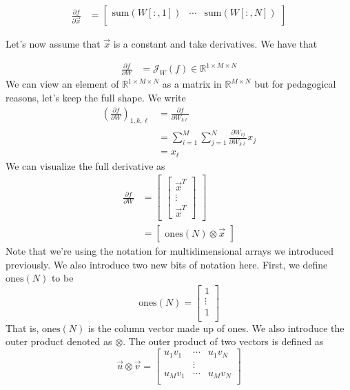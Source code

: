 \documentclass[book.tex]{subfiles}
\begin{document}
\begin{align}
\frac{\partial f}{\partial \vec{x}} &= \begin{bmatrix}
\textrm{sum}(W[:, 1]) & \cdots & \textrm{sum}(W[:, N]) \\
\end{bmatrix} 
\end{align}

Let's now assume that $\vec{x}$ is a constant and take derivatives. We have that

\begin{align}
    \frac{\partial f}{\partial W} &= \mathcal{J}_{W}(f) \in \mathbb{R}^{1 \times M \times N} 
\end{align}
We can view an element of $\mathbb{R}^{1 \times M \times N}$ as a matrix  in $\mathbb{R}^{M \times N}$ but for pedagogical reasons, let's keep the full shape. We write
\begin{align}
\left (\frac{\partial f}{\partial W}\right )_{1, k, \ell} &= \frac{\partial f}{\partial W_{k \ell}} \\
&= \sum_{i=1}^M \sum_{j=1}^N \frac{\partial W_{ij}}{\partial W_{k \ell}} x_j \\
&= x_{\ell} 
\end{align}
We can visualize the full derivative as
\begin{align}
\frac{\partial f}{\partial W} &=
    \begin{bmatrix}
    \begin{bmatrix}
    \vec{x}^T \\
    \vdots \\
    \vec{x}^T
    \end{bmatrix} 
    \end{bmatrix} \\
    &= \begin{bmatrix} \textrm{ones}(N) \otimes \vec{x} \end{bmatrix} 
\end{align}
Note that we're using the notation for multidimensional arrays we introduced previously. We also introduce two new bits of notation here. First, we define $\textrm{ones}(N)$ to be
\[ \textrm{ones}(N) = \begin{bmatrix}
1 \\
\vdots \\
1 \\ 
\end{bmatrix} \]
That is, $\textrm{ones}(N)$ is the column vector made up of ones. We also introduce the outer product denoted as $\otimes$. The outer product of two vectors is defined as
\[ \vec{u} \otimes \vec{v} = \begin{bmatrix}
u_1 v_1 & \cdots & u_1 v_N \\
& \vdots & \\
u_M v_1 & \cdots & u_M v_N \\
\end{bmatrix} \]
\end{document}
